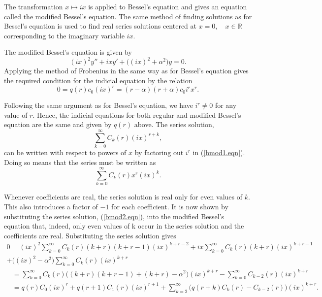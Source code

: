 \documentclass[12pt]{article}
\theoremstyle{definition}
\numberwithin{equation}{section}
\begin{document}
{The transformation $x\mapsto ix$ is applied to Bessel's equation and gives an equation called the modified Bessel's equation. The same method of finding solutions as for Bessel's equation is used to find real series solutions centered at $x=0,\quad x\in\mathbb{R}$ corresponding to the imaginary variable $ix$.

The modified Bessel's equation is given by
$$(ix)^2y''+ixy'+\big((ix)^2+\alpha^2\big)y=0.$$
Applying the method of Frobenius in the same way as for Bessel's equation gives the required condition for the indicial equation by the relation
\begin{equation}
0=q(r)c_0(ix)^r=(r-\alpha)(r+\alpha)c_0i^rx^r.
\label{bmod1.eqn}
\end{equation}

Following the same argument as for Bessel's equation, we have $i^r\neq 0$ for any value of $r$. Hence, the indicial equations for both regular and modified Bessel's equation are the same and given by $q(r)$ above. The series solution,
\begin{equation}
\sum_{k=0}^\infty C_k(r)(ix)^{r+k},
\label{bmod2.eqn}
\end{equation}
can be written with respect to powers of $x$ by factoring out $i^r$ in (\ref{bmod1.eqn}). Doing so means that the series must be written as
\begin{equation}
\sum_{k=0}^\infty C_k(r)x^r(ix)^k.
\end{equation}

Whenever coefficients are real, the series solution is real only for even values of $k$. This also introduces a factor of $-1$ for each coefficient. It is now shown by substituting the series solution, (\ref{bmod2.eqn}), into the modified Bessel's equation that, indeed, only even values of k occur in the series solution and the coefficients are real. Substituting the series solution gives
\begin{multline}
0=(ix)^2\sum_{k=0}^\infty C_k(r)(k+r)(k+r-1)(ix)^{k+r-2}+ix\sum_{k=0}^\infty C_k(r)(k+r)(ix)^{k+r-1}\\+\big((ix)^2-\alpha^2\big)\sum_{k=0}^\infty C_k(r)(ix)^{k+r}\nonumber
\end{multline}
\begin{align}
&=\sum_{k=0}^\infty C_k(r)\Big((k+r)(k+r-1)+(k+r)-\alpha^2\Big)(ix)^{k+r}-\sum_{k=0}^\infty C_{k-2}(r)(ix)^{k+r}\nonumber\\
&=q(r)C_0(ix)^r+q(r+1)C_1(r)(ix)^{r+1}+\sum_{k=2}^\infty\Big(q(r+k)C_k(r)-C_{k-2}(r)\Big)(ix)^{k+r}.
\label{bmod3.eqn}
\end{align}

}
\end{document}
